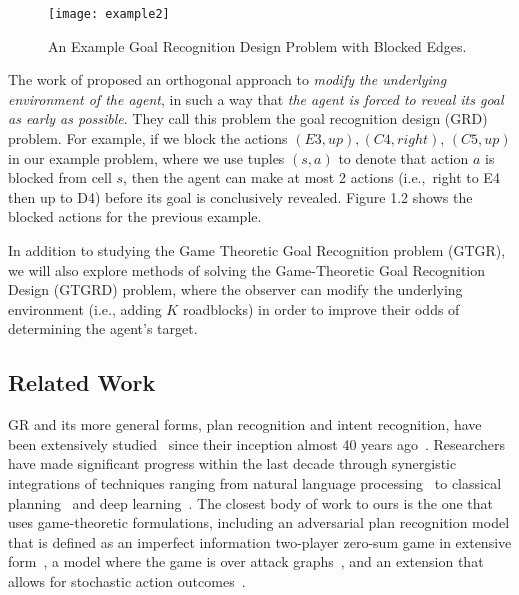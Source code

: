 \begin{figure}[h!]
\begin{center}

  \texttt{[image: example2]}
  \end{center}

  \caption{An Example Goal Recognition Design Problem with Blocked Edges.}
  \label{fig:example2}
\end{figure}


The work of \cite{keren:14,keren:15} proposed an orthogonal 
approach to \emph{modify the underlying environment of the agent}, in such a way that 
\emph{the agent is forced to reveal its goal as early as possible}. 
They call this problem the goal recognition design (GRD) problem. 
For example, if we block the actions $(E3, up), (C4, right)$, $(C5, up)$ in our example problem, 
where we use tuples $(s,a)$ to denote that action $a$ is blocked from cell $s$, then the agent can 
make at most 2 actions (i.e.,~right to E4 then up to D4) before its goal is conclusively revealed. 
Figure 1.2 shows the blocked actions for the previous example. 

In addition to studying the Game Theoretic Goal Recognition problem (GTGR), we will also explore methods of solving the Game-Theoretic Goal Recognition Design  (GTGRD) problem, where the observer can modify the underlying environment (i.e., adding $K$ roadblocks)
in order to improve their odds of determining the agent's target.

\subsection{Related Work}

GR and its more general forms, plan recognition and intent recognition, have been extensively studied~\cite{Sukthankar:14} since their inception almost 40 years ago~\cite{schmidt:78}. Researchers have made significant progress within the last decade through synergistic integrations of techniques ranging from natural language processing~\cite{vilain:90,geib:07} to classical planning~\cite{ramirez:09,ramirez:10,ramirez:11} and deep learning~\cite{min:14}. The closest body of work to ours is the one that uses game-theoretic formulations, including an adversarial plan recognition model that is defined as an imperfect information two-player zero-sum game in extensive form~\cite{lisy:12}, 
a model where the game is over attack graphs~\cite{braynov:06}, 
and an extension that allows for stochastic action outcomes~\cite{guillarme:15}. 

